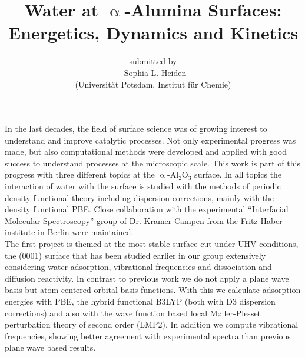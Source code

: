 \documentclass[11pt,DIV=13,a4paper,headinclude]{scrartcl}
\begin{document}
\titlehead{\centering\normalfont\large\scshape Scientific Abstract}
\title{\Large\vspace{-\baselineskip} Water at $\upalpha$-Alumina Surfaces:\\
  Energetics, Dynamics and Kinetics\vspace{0\baselineskip}}
\author{\large\sffamily submitted by\\
  \Large\textbf\sffamily\ Sophia L. Heiden\\
  \large\sffamily (Universit\"{a}t Potsdam, Institut f\"{u}r Chemie)}
\date{}

\maketitle

In the last decades, the field of surface science was of growing interest to understand and improve catalytic processes.
Not only experimental progress was made, but also computational methods were developed and applied with good success to understand processes at the microscopic scale.
This work is part of this progress with three different topics at the $\upalpha$-Al$_2$O$_3$ surface.
In all topics the interaction of water with the surface is studied with the methods of periodic density functional theory including dispersion corrections, mainly with the density functional PBE.
Close collaboration with the experimental ``Interfacial Molecular Spectroscopy'' group of Dr. Kramer Campen from the Fritz Haber institute in Berlin were maintained.
\\


The first project is themed at the most stable surface cut under UHV conditions, the (0001) surface that has been studied earlier in our group extensively considering water adsorption, vibrational frequencies and dissociation and diffusion reactivity.
In contrast to previous work we do not apply a plane wave basis but atom centered orbital basis functions.
With this we calculate adsorption energies with PBE, the hybrid functional B3LYP (both with D3 dispersion corrections) and also with the wave function based local M\o{}ller-Plesset perturbation theory of second order (LMP2).
In addition we compute vibrational frequencies, showing better agreement with experimental spectra than previous plane wave based results.
\end{document}
